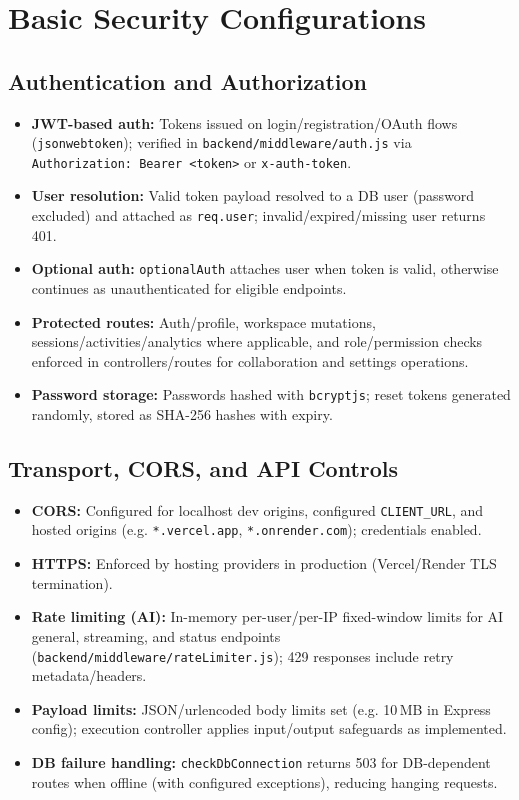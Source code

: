 ﻿\documentclass[11pt,a4paper]{article}
\begin{document}
\section{Basic Security Configurations}

\subsection{Authentication and Authorization}
\begin{itemize}[leftmargin=*]
  \item \textbf{JWT-based auth:} Tokens issued on login/registration/OAuth flows (\texttt{jsonwebtoken}); verified in \texttt{backend/middleware/auth.js} via \texttt{Authorization: Bearer <token>} or \texttt{x-auth-token}.
  \item \textbf{User resolution:} Valid token payload resolved to a DB user (password excluded) and attached as \texttt{req.user}; invalid/expired/missing user returns 401.
  \item \textbf{Optional auth:} \texttt{optionalAuth} attaches user when token is valid, otherwise continues as unauthenticated for eligible endpoints.
  \item \textbf{Protected routes:} Auth/profile, workspace mutations, sessions/activities/analytics where applicable, and role/permission checks enforced in controllers/routes for collaboration and settings operations.
  \item \textbf{Password storage:} Passwords hashed with \texttt{bcryptjs}; reset tokens generated randomly, stored as SHA-256 hashes with expiry.
\end{itemize}

\subsection{Transport, CORS, and API Controls}
\begin{itemize}[leftmargin=*]
  \item \textbf{CORS:} Configured for localhost dev origins, configured \texttt{CLIENT\_URL}, and hosted origins (e.g. \texttt{*.vercel.app}, \texttt{*.onrender.com}); credentials enabled.
  \item \textbf{HTTPS:} Enforced by hosting providers in production (Vercel/Render TLS termination).
  \item \textbf{Rate limiting (AI):} In-memory per-user/per-IP fixed-window limits for AI general, streaming, and status endpoints (\texttt{backend/middleware/rateLimiter.js}); 429 responses include retry metadata/headers.
  \item \textbf{Payload limits:} JSON/urlencoded body limits set (e.g. 10\,MB in Express config); execution controller applies input/output safeguards as implemented.
  \item \textbf{DB failure handling:} \texttt{checkDbConnection} returns 503 for DB-dependent routes when offline (with configured exceptions), reducing hanging requests.
\end{itemize}
\end{document}
